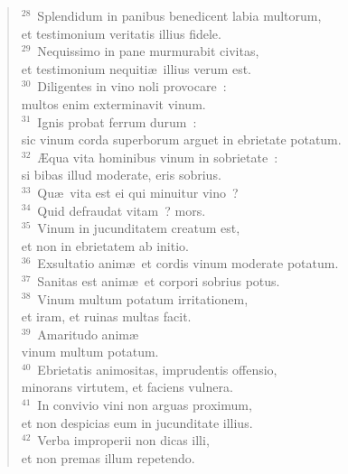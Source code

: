 \begin{flushleft}
\begin{verse}
${}^{28}$~Splendidum in panibus benedicent labia multorum,\\ et testimonium veritatis illius fidele.\\
${}^{29}$~Nequissimo in pane murmurabit civitas,\\ et testimonium nequiti\ae\ illius verum est.\\
${}^{30}$~Diligentes in vino noli provocare~:\\ multos enim exterminavit vinum.\\
${}^{31}$~Ignis probat ferrum durum~:\\ sic vinum corda superborum arguet in ebrietate potatum.\\
${}^{32}$~\AE qua vita hominibus vinum in sobrietate~:\\ si bibas illud moderate, eris sobrius.\\
${}^{33}$~Qu\ae\ vita est ei qui minuitur vino~?\\
${}^{34}$~Quid defraudat vitam~? mors.\\
${}^{35}$~Vinum in jucunditatem creatum est,\\ et non in ebrietatem ab initio.\\
${}^{36}$~Exsultatio anim\ae\ et cordis vinum moderate potatum.\\
${}^{37}$~Sanitas est anim\ae\ et corpori sobrius potus.\\
${}^{38}$~Vinum multum potatum irritationem,\\ et iram, et ruinas multas facit.\\
${}^{39}$~Amaritudo anim\ae \\ vinum multum potatum.\\
${}^{40}$~Ebrietatis animositas, imprudentis offensio,\\ minorans virtutem, et faciens vulnera.\\
${}^{41}$~In convivio vini non arguas proximum,\\ et non despicias eum in jucunditate illius.\\
${}^{42}$~Verba improperii non dicas illi,\\ et non premas illum repetendo.\end{verse}\end{flushleft}


